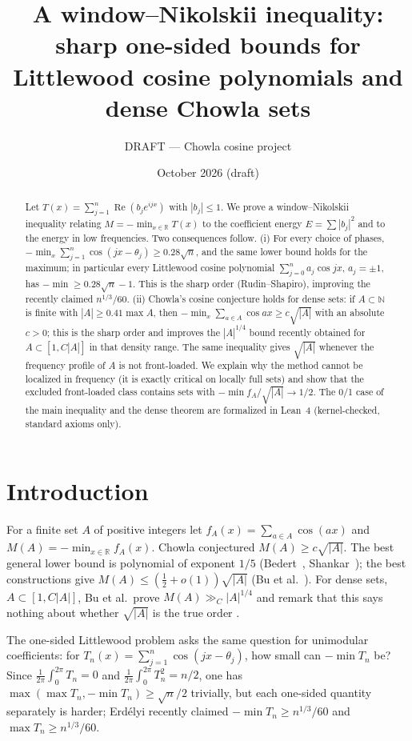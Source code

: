 \documentclass[11pt]{amsart}
\title[A window--Nikolskii inequality]{A window--Nikolskii inequality: sharp one-sided bounds for\\ Littlewood cosine polynomials and dense Chowla sets}
\author{DRAFT --- Chowla cosine project}
\date{October 2026 (draft)}
\theoremstyle{remark}
\newcommand{\R}{\mathbb{R}}
\newcommand{\N}{\mathbb{N}}
\newcommand{\avg}{\frac{1}{2\pi}\int_0^{2\pi}}
\begin{document}
\begin{abstract}
Let $T(x)=\sum_{j=1}^{n}\operatorname{Re}(b_je^{ijx})$ with $|b_j|\le 1$. We prove a window--Nikolskii inequality relating
$M=-\min_{x\in\R}T(x)$ to the coefficient energy $E=\sum|b_j|^2$ and to the energy in low frequencies. Two consequences
follow. (i) For every choice of phases, $-\min_x\sum_{j=1}^n\cos(jx-\theta_j)\ge 0.28\sqrt n$, and the same lower bound
holds for the maximum; in particular every Littlewood cosine polynomial $\sum_{j=0}^n a_j\cos jx$, $a_j=\pm1$, has
$-\min\ge 0.28\sqrt n-1$. This is the sharp order (Rudin--Shapiro), improving the recently claimed $n^{1/3}/60$.
(ii) Chowla's cosine conjecture holds for dense sets: if $A\subset\N$ is finite with $|A|\ge 0.41\max A$, then
$-\min_x\sum_{a\in A}\cos ax\ge c\sqrt{|A|}$ with an absolute $c>0$; this is the sharp order and improves the
$|A|^{1/4}$ bound recently obtained for $A\subset[1,C|A|]$ in that density range. The same inequality gives
$\sqrt{|A|}$ whenever the frequency profile of $A$ is not front-loaded. We explain why the method cannot be localized
in frequency (it is exactly critical on locally full sets) and show that the excluded front-loaded class contains
sets with $-\min f_A/\sqrt{|A|}\to 1/2$. The 0/1 case of the main inequality and the dense theorem are formalized in
Lean~4 (kernel-checked, standard axioms only).
\end{abstract}
\maketitle

\section{Introduction}
For a finite set $A$ of positive integers let $f_A(x)=\sum_{a\in A}\cos(ax)$ and $M(A)=-\min_{x\in\R}f_A(x)$.
Chowla conjectured $M(A)\ge c\sqrt{|A|}$. The best general lower bound is polynomial of exponent $1/5$
(Bedert~\cite{Bedert}, Shankar~\cite{Shankar}); the best constructions give $M(A)\le(\frac12+o(1))\sqrt{|A|}$
(Bu et al.~\cite{Bu}). For dense sets, $A\subset[1,C|A|]$, Bu et al.\ prove $M(A)\gg_C|A|^{1/4}$ and remark that this
says nothing about whether $\sqrt{|A|}$ is the true order \cite[Prop.~9.7, Rem.~9.8]{Bu}.

The one-sided Littlewood problem asks the same question for unimodular coefficients: for
$T_n(x)=\sum_{j=1}^n\cos(jx-\theta_j)$, how small can $-\min T_n$ be? Since $\avg T_n=0$ and $\avg T_n^2=n/2$, one has
$\max(\max T_n,-\min T_n)\ge\sqrt{n}/2$ trivially, but each one-sided quantity separately is harder; Erd\'elyi
\cite{Erdelyi} recently claimed $-\min T_n\ge n^{1/3}/60$ and $\max T_n\ge n^{1/3}/60$.
\end{document}
